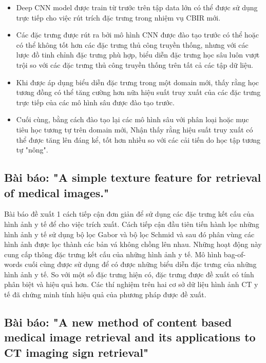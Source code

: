 \documentclass[a4paper,14pt]{extreport}
\begin{document}
\begin{itemize}
        \item Deep CNN model được train từ trước trên tập data lớn có thể được sử dụng trực tiếp cho việc rút trích đặc trưng trong nhiệm vụ CBIR mới.
        \item Các đặc trưng được rút ra bởi mô hình CNN được đào tạo trước có thể hoặc có thể không tốt hơn các đặc trưng thủ công truyền thống, nhưng với các lược đồ tinh chỉnh đặc trưng phù hợp, biểu diễn đặc trưng học sâu luôn vượt trội so với các đặc trưng thủ công truyền thống trên tất cả các tập dữ liệu.
        \item Khi được áp dụng biểu diễn đặc trưng trong một domain mới, thấy rằng học tương đồng có thể tăng cường hơn nữa hiệu suất truy xuất của các đặc trưng trực tiếp của các mô hình sâu được đào tạo trước.
        \item Cuối cùng, bằng cách đào tạo lại các mô hình sâu với phân loại hoặc mục tiêu học tương tự trên domain mới, Nhận thấy rằng hiệu suất truy xuất có thể được tăng lên đáng kể, tốt hơn nhiều so với các cải tiến do học tập tương tự "nông".

\end{itemize}

\subsection{Bài báo: "A simple texture feature for retrieval of medical images." \cite{paper-2}}

Bài báo đề xuất 1 cách tiếp cận đơn giản để sử dụng các đặc trưng kết cấu của hình ảnh y tế để cho việc trích xuất. Cách tiếp cận đầu tiên tiến hành lọc những hình ảnh y tế sử dụng bộ lọc Gabor và bộ lọc Schmid và sau đó phân vùng các hình ảnh được lọc thành các bản vá không chồng lên nhau. Những hoạt động này cung cấp thông đặc trưng kết cấu của những hình ảnh y tế. Mô hình bag-of-words cuối cùng được sử dụng để có được những biểu diễn đặc trưng của những hình ảnh y tế. So với một số đặc trưng hiện có, đặc trưng được đề xuất có tính phân biệt và hiệu quả hơn. Các thí nghiệm trên hai cơ sở dữ liệu hình ảnh CT y tế đã chứng minh tính hiệu quả của phương pháp được đề xuất.

\subsection{Bài báo: "A new method of content based medical image retrieval and its applications to CT imaging sign retrieval" \cite{paper-3}}
\end{document}
